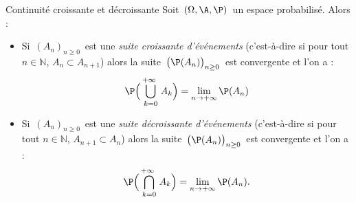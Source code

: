 \documentclass[a4paper,10pt]{report}
\begin{document}
\begin{enumerate}
%

\begin{Theoreme}{Continuité croissante et décroissante}
Soit $\,(\Omega , \A , \P)\,$ un espace probabilisé. Alors :

\vspace{0.2cm}

\begin{itemize}
\item Si $\,(A_n)_{n \geq 0}\,$ est une \emph{suite croissante d'événements} 
(c'est-à-dire si pour tout $n \in \mathbb{N}$, $A_n\subset A_{n+1}$) alors la suite $\,\big(\P(A_n)\big)_{n \geq 0}\,$ est convergente et l'on a :
$$\P\Big(\bigcup_{k=0}^{+\infty\ }A_k\Big) =\lim_{n\to+\infty}\P(A_n)$$
\item  Si $\,(A_n)_{n \geq 0}\,$ est une \emph{suite décroissante d'événements}
(c'est-à-dire si pour tout $n \in \mathbb{N}$,  $A_{n+1}\subset A_n$) alors la suite $\,\big(\P(A_n)\big)_{n \geq 0}\,$ est convergente et l'on a :
$$\P\Big(\bigcap_{k=0}^{+\infty\ }A_k\Big) = \lim\limits_{n\to+\infty}\P(A_n).$$
\end{itemize}
\end{Theoreme}

\begin{Demonstration}{} 



\end{Demonstration}
\end{enumerate}
\end{document}
